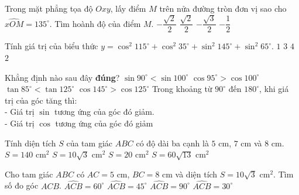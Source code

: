\begin{ex}
	Trong mặt phẳng tọa độ $Oxy$, lấy điểm $M$ trên nửa đường tròn đơn vị sao cho $\widehat{xOM}=135^\circ$. Tìm hoành độ của điểm $M$.
	\choice
	{\True $-\dfrac{\sqrt{2}}{2}$}
	{$\dfrac{\sqrt{2}}{2}$}
	{$-\dfrac{\sqrt{3}}{2}$}
	{$-\dfrac{1}{2}$}
\end{ex}
\begin{ex}
	Tính giá trị của biểu thức $y=\cos^2 115^\circ+\cos^2 35^\circ+\sin^2 145^\circ +\sin^2 65^\circ$.
	\choice
	{$1$}
	{$3$}
	{$4$}
	{\True $2$}
\end{ex}
\begin{ex}
	Khẳng định nào sau đây \textbf{đúng}?
	\choice
	{$\sin 90^\circ <\sin 100^\circ $}
	{\True $\cos 95^\circ >\cos 100^\circ $}
	{$\tan 85^\circ <\tan 125^\circ $}
	{$\cos 145^\circ >\cos 125^\circ $}
	\loigiai
	{Trong khoảng từ $90^\circ $ đến $180^\circ $, khi giá trị của góc tăng thì:\\
		- Giá trị $\sin$ tương ứng của góc đó giảm.\\
		- Giá trị $\cos$ tương ứng của góc đó giảm}
\end{ex}
\begin{ex}
	Tính diện tích $S$ của tam giác $ABC$ có độ dài ba cạnh là $5$ cm, $7$ cm và $8$ cm.
	\choice
	{$S=140$ cm$^2$}
	{\True $S=10\sqrt{3}$ cm$^2$}
	{$S=20$ cm$^2$}
	{$S=60\sqrt{13}$ cm$^2$}
\end{ex}
\begin{ex}
	Cho tam giác $ABC$ có $AC=5$ cm, $BC=8$ cm và diện tích $S=10\sqrt{3}$ cm$^2$. Tìm số đo góc $ACB$.
	\choice
	{\True $\widehat{ACB}=60^{\circ}$}
	{$\widehat{ACB}=45^{\circ}$}
	{$\widehat{ACB}=90^{\circ}$}
	{$\widehat{ACB}=30^{\circ}$}
\end{ex}
